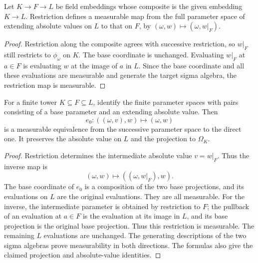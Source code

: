 \begin{lemma}
\label{lem:tower-scalar-restriction}
\leanok
{}
Let $K\to F\to L$ be field embeddings whose composite is the given
embedding $K\to L$. Restriction defines a measurable map from the
full parameter space of extending absolute values on $L$ to that on
$F$, by $(\omega,w)\mapsto(\omega,w|_F)$.
\end{lemma}
\begin{proof}
Restriction along the composite agrees with successive restriction,
so $w|_F$ still restricts to $\phi_\omega$ on $K$. The base
coordinate is unchanged. Evaluating $w|_F$ at $a\in F$ is evaluating
$w$ at the image of $a$ in $L$. Since the base coordinate and all
these evaluations are measurable and generate the target sigma
algebra, the restriction map is measurable.
\end{proof}

\begin{lemma}
\label{lem:finite-tower-parameters}
\leanok
{}
For a finite tower $K\subseteq F\subseteq L$, identify the finite
parameter spaces with pairs consisting of a base parameter and an
extending absolute value. Then
\[
 e_0:((\omega,v),w)\longmapsto(\omega,w)
\]
is a measurable equivalence from the successive parameter space to
the direct one. It preserves the absolute value on $L$ and the
projection to $\Omega_K$.
\end{lemma}
\begin{proof}
Restriction determines the intermediate absolute value $v=w|_F$.
Thus the inverse map is
\[
 (\omega,w)\longmapsto((\omega,w|_F),w).
\]
The base coordinate of $e_0$
is a composition of the two base projections, and its evaluations
on $L$ are the original evaluations. They are all measurable.
For the inverse, the intermediate parameter is obtained by
restriction to $F$; the pullback of an evaluation at $a\in F$ is
the evaluation at its image in $L$, and its base projection is
the original base projection. Thus this restriction is measurable.
The remaining $L$ evaluations are unchanged. The generating
descriptions of the two sigma algebras prove measurability in both
directions. The formulas also give the claimed projection and
absolute-value identities.
\end{proof}

